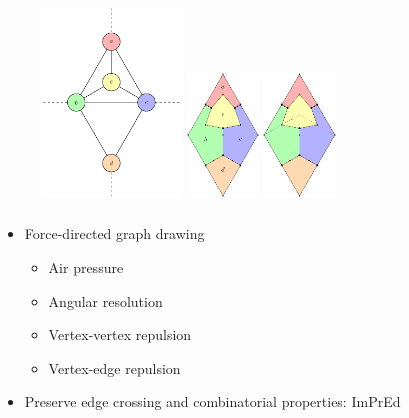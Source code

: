 \documentclass[t,18pt]{beamer}
\begin{document}
\begin{frame}[c]
  \frametitle{}
  \begin{figure}
    \includegraphics[align=c,height=5cm]{../Thesis/Resources/Transformation-Algorithm-2.pdf}\qquad
    \includegraphics[align=c,height=3.2753cm]{../Thesis/Resources/Transformation-Algorithm-3.pdf}\qquad
    \includegraphics[align=c,height=3.2753cm]{../Thesis/Resources/Transformation-Algorithm-4.pdf}
  \end{figure}
\end{frame}

\begin{frame}
  \frametitle{}
  \begin{itemize}
    \item Force-directed graph drawing \begin{itemize}
      \item Air pressure
      \item Angular resolution
      \item Vertex-vertex repulsion
      \item Vertex-edge repulsion
    \end{itemize}
    \item Preserve edge crossing and combinatorial properties: ImPrEd
  \end{itemize}
\end{frame}
\end{document}
